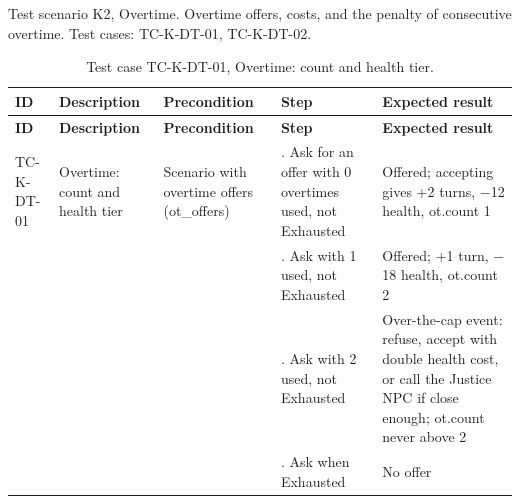 Test scenario K2, Overtime. Overtime offers, costs, and the penalty of consecutive overtime. Test cases: TC-K-DT-01, TC-K-DT-02.

{\small
\begin{longtable}{|>{\raggedright\arraybackslash}p{}|>{\raggedright\arraybackslash}p{}|>{\raggedright\arraybackslash}p{}|>{\raggedright\arraybackslash}p{}|>{\raggedright\arraybackslash}p{}|}
\caption{Test case TC-K-DT-01, Overtime: count and health tier.} \\
\hline
\textbf{ID} & \textbf{Description} & \textbf{Precondition} & \textbf{Step} & \textbf{Expected result} \\ \hline
\endfirsthead
\hline
\textbf{ID} & \textbf{Description} & \textbf{Precondition} & \textbf{Step} & \textbf{Expected result} \\ \hline
\endhead
TC-K-DT-01 & Overtime: count and health tier & Scenario with overtime offers (ot\_offers) & 1. Ask for an offer with 0 overtimes used, not Exhausted & Offered; accepting gives +2 turns, $-$12 health, ot.count 1 \\ \hline
 &  &  & 2. Ask with 1 used, not Exhausted & Offered; +1 turn, $-$18 health, ot.count 2 \\ \hline
 &  &  & 3. Ask with 2 used, not Exhausted & Over-the-cap event: refuse, accept with double health cost, or call the Justice NPC if close enough; ot.count never above 2 \\ \hline
 &  &  & 4. Ask when Exhausted & No offer \\ \hline
\end{longtable}
}

